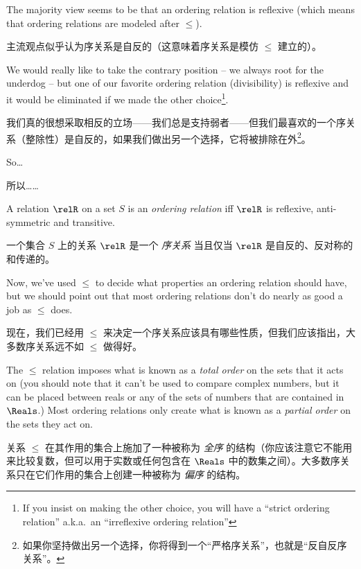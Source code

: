 The 
majority view seems to be that an ordering relation is
reflexive (which means that 
ordering relations are modeled after $\leq$).

主流观点似乎认为序关系是自反的（这意味着序关系是模仿 $\leq$ 建立的）。

We would really like to take the contrary position -- we always
root for the underdog -- but one of our favorite ordering
relation (divisibility) is reflexive and it would be eliminated
if we made the other choice\footnote{If you insist on making the other %
choice, you will have a ``strict ordering relation'' a.k.a.\ an ``irreflexive %
ordering relation''}.

我们真的很想采取相反的立场——我们总是支持弱者——但我们最喜欢的一个序关系（整除性）是自反的，如果我们做出另一个选择，它将被排除在外\footnote{如果你坚持做出另一个选择，你将得到一个“严格序关系”，也就是“反自反序关系”。}。

So\ldots

所以……

\begin{defi}
A relation $\relR$ on a set $S$ is an 
\emph{ordering relation}
iff $\relR$ is reflexive, anti-symmetric and transitive.
\end{defi}

\begin{defi}
一个集合 $S$ 上的关系 $\relR$ 是一个
\emph{序关系}
当且仅当 $\relR$ 是自反的、反对称的和传递的。
\end{defi}

Now, we've used $\leq$ to decide what properties an ordering relation
should have, but we should point out that most ordering relations
don't do nearly as good a job as $\leq$ does.

现在，我们已经用 $\leq$ 来决定一个序关系应该具有哪些性质，但我们应该指出，大多数序关系远不如 $\leq$ 做得好。

The $\leq$ relation
imposes what is known as a \emph{total order}
on the sets that it acts on (you should note that it can't be used
to compare complex numbers, but it can be placed between reals or
any of the sets of numbers that are contained in $\Reals$.)  Most
ordering relations only create what is known as a 
\emph{partial order} on the sets they act on.

关系 $\leq$ 在其作用的集合上施加了一种被称为 \emph{全序} 的结构（你应该注意它不能用来比较复数，但可以用于实数或任何包含在 $\Reals$ 中的数集之间）。大多数序关系只在它们作用的集合上创建一种被称为 \emph{偏序} 的结构。

